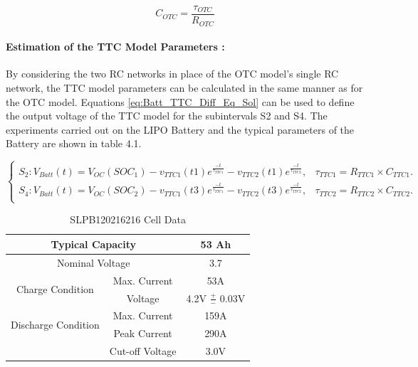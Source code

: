 \begin{equation}\label{eq:Batt_OTC_C_OTC}
	C_{OTC} = \frac{\tau_{OTC}}{R_{OTC}}
\end{equation}

\paragraph{Estimation of the TTC Model Parameters :} 

By considering the two RC networks in place of the OTC model's single RC network, the TTC model parameters can be calculated in the same manner as for the OTC model. Equations \ref{eq:Batt_TTC_Diff_Eq_Sol} can be used to define the output voltage of the TTC model for the subintervals S2 and S4. The experiments carried out on the LIPO Battery and the typical parameters of the Battery are shown in table 4.1.

\begin{equation}\label{eq:Batt_TTC_Diff_Eq_Sol}
	\begin{cases}
	  S_2 : V_{Batt}(t) = V_{OC}(SOC_1) - v_{TTC1}(t1) e^{\frac{-t}{\tau_{TTC1}}} - v_{TTC2}(t1) e^{\frac{-t}{\tau_{TTC2}}},&\tau_{TTC1} = R_{TTC1}\times C_{TTC1}.\\
	  S_4 : V_{Batt}(t) = V_{OC}(SOC_2) - v_{TTC1}(t3) e^{\frac{-t}{\tau_{TTC1}}} - v_{TTC2}(t3) e^{\frac{-t}{\tau_{TTC2}}},&\tau_{TTC2} = R_{TTC2}\times C_{TTC2}. \\
	\end{cases}
\end{equation}


\begin{table}[ht]\label{tb:SLPB120216216_Cell_Data }
	\begin{center}
		\begin{tabular}{|c|c|c|}
			\hline
			\multicolumn{2}{|c|}{{Typical Capacity }} & 53 Ah\\
			\hline
			\multicolumn{2}{|c|}{{Nominal Voltage}} & 3.7\\
			\hline
			\multicolumn{1}{|c|}{\multirow{2}{*}{Charge Condition}}& Max. Current & 53A\\ 
			\multicolumn{1}{|c|}{}& Voltage & 4.2V $\frac{+}{-}$ 0.03V\\
			\hline
			\multicolumn{1}{|c|}{\multirow{2}{*}{Discharge Condition}}& Max. Current & 159A\\
			\multicolumn{1}{|c|}{}& Peak Current & 290A\\
			\multicolumn{1}{|c|}{}& Cut-off Voltage & 3.0V\\
			\hline
		\end{tabular}
		\caption{SLPB120216216 Cell Data }
	\end{center}
	\label{tab:multicol}
\end{table}

